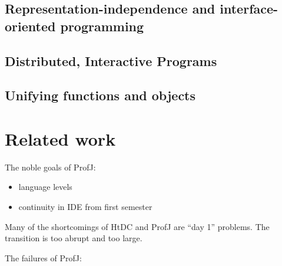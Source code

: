\documentclass[submission,copyright]{eptcs}
\begin{document}
\subsection{Representation-independence and interface-oriented programming}

\subsection{Distributed, Interactive Programs}

\subsection{Unifying functions and objects}


\section{Related work}

\cite{dvanhorn:Gray2003ProfessorJ}

\cite{dvanhorn:Allen2002DrJava, dvanhorn:Hsia2005Taming}

\cite{dvanhorn:Kolling2003}

\cite{dvanhorn:Bruce2001Library}

\cite{dvanhorn:Alphonce2003Using}

\cite{dvanhorn:Chakravarty2004Risks}

\cite{dvanhorn:Ragde2008Chilling}

\cite{dvanhorn:Bloch2000Scheme}

The noble goals of ProfJ:

\begin{itemize}
\item language levels
\item continuity in IDE from first semester
\end{itemize}

Many of the shortcomings of HtDC and ProfJ are ``day 1'' problems.
The transition is too abrupt and too large.

The failures of  ProfJ:
\end{document}
